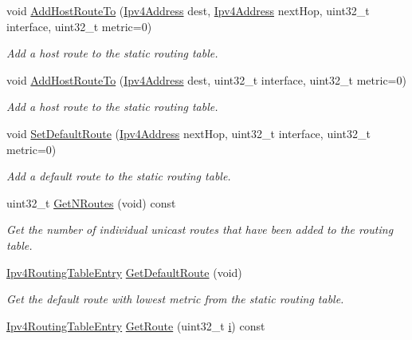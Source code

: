 \begin{DoxyCompactItemize}
void \hyperlink{classns3_1_1Ipv4StaticRouting_ae96452233179689167e57b49b4339005}{Add\+Host\+Route\+To} (\hyperlink{classns3_1_1Ipv4Address}{Ipv4\+Address} dest, \hyperlink{classns3_1_1Ipv4Address}{Ipv4\+Address} next\+Hop, uint32\+\_\+t interface, uint32\+\_\+t metric=0)
\begin{DoxyCompactList}\small\item\em Add a host route to the static routing table. \end{DoxyCompactList}\item 
void \hyperlink{classns3_1_1Ipv4StaticRouting_ac3d02e2f2145ea86eb4d6efca40dfad0}{Add\+Host\+Route\+To} (\hyperlink{classns3_1_1Ipv4Address}{Ipv4\+Address} dest, uint32\+\_\+t interface, uint32\+\_\+t metric=0)
\begin{DoxyCompactList}\small\item\em Add a host route to the static routing table. \end{DoxyCompactList}\item 
void \hyperlink{classns3_1_1Ipv4StaticRouting_aee30fa3246c2b42f122dabdff2725331}{Set\+Default\+Route} (\hyperlink{classns3_1_1Ipv4Address}{Ipv4\+Address} next\+Hop, uint32\+\_\+t interface, uint32\+\_\+t metric=0)
\begin{DoxyCompactList}\small\item\em Add a default route to the static routing table. \end{DoxyCompactList}\item 
uint32\+\_\+t \hyperlink{classns3_1_1Ipv4StaticRouting_a074f780e02f4252e8daa59ed70f499ab}{Get\+N\+Routes} (void) const 
\begin{DoxyCompactList}\small\item\em Get the number of individual unicast routes that have been added to the routing table. \end{DoxyCompactList}\item 
\hyperlink{classns3_1_1Ipv4RoutingTableEntry}{Ipv4\+Routing\+Table\+Entry} \hyperlink{classns3_1_1Ipv4StaticRouting_a3e3079305b988d61fdd56d9990499a6e}{Get\+Default\+Route} (void)
\begin{DoxyCompactList}\small\item\em Get the default route with lowest metric from the static routing table. \end{DoxyCompactList}\item 
\hyperlink{classns3_1_1Ipv4RoutingTableEntry}{Ipv4\+Routing\+Table\+Entry} \hyperlink{classns3_1_1Ipv4StaticRouting_a2bd58c5ceeaff35b32a68826fbec5245}{Get\+Route} (uint32\+\_\+t \hyperlink{lte__uplink__power__control_8m_a6f6ccfcf58b31cb6412107d9d5281426}{i}) const 

\end{DoxyCompactItemize}
